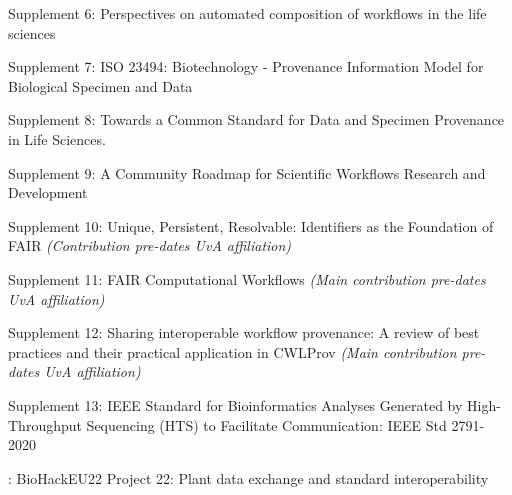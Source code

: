  \cite{ch6-37}

 \cite{De Geest 2022}

 \cite{Goble 2021}

 \cite{Crusoe 2022}

 \cite{Kuhn 2021}

Supplement 6:
Perspectives on automated composition of workflows in the life sciences \cite{lamprechtPerspectivesAutomatedComposition2021b}

Supplement 7: ISO 23494: Biotechnology - Provenance Information Model for Biological
Specimen and Data \cite{Wittner 2020}

Supplement 8: Towards a
Common Standard for Data and Specimen Provenance in Life Sciences. \cite{Wittner 2023}

Supplement 9: A Community Roadmap for Scientific Workflows Research and Development \cite{ch6-39}

Supplement 10: Unique, Persistent, Resolvable: Identifiers as the Foundation of FAIR \cite{Juty 2020} 
\emph{(Contribution pre-dates UvA affiliation)} 

Supplement 11: FAIR Computational Workflows \cite{Goble 2020} \emph{(Main contribution pre-dates UvA
affiliation)} 

Supplement 12: Sharing
interoperable workflow provenance: A review of best practices and their
practical application in CWLProv \cite{ch5-68} \emph{(Main contribution pre-dates UvA
affiliation)} 

Supplement
13: IEEE Standard for Bioinformatics Analyses Generated by
High-Throughput Sequencing (HTS) to Facilitate Communication: IEEE Std
2791-2020 \cite{ch5-64}

: BioHackEU22 Project 22: Plant data exchange and standard interoperability


